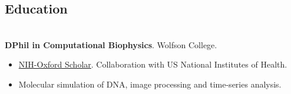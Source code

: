 \documentclass[margin]{res}
\begin{document}
 
\begin{sloppypar}
 
 




\begin{resume} 
\setlength{\parskip}{1.00ex}
\setlength{\parindent}{0pt}
 
\section{Education} 
\\
\textbf{DPhil in Computational Biophysics}. Wolfson College.

\begin{itemize}
    \item \href{http://oxcam.gpp.nih.gov/}{NIH-Oxford Scholar}. Collaboration with US National Institutes of Health.
    \item Molecular simulation of DNA, image processing and time-series analysis. 
\end{itemize}



\end{resume}
\end{sloppypar}
\end{document}
